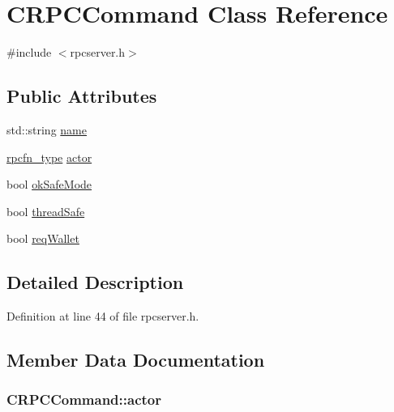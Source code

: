 \hypertarget{class_c_r_p_c_command}{}\section{C\+R\+P\+C\+Command Class Reference}
\label{class_c_r_p_c_command}


{\ttfamily \#include $<$rpcserver.\+h$>$}

\subsection*{Public Attributes}
\begin{DoxyCompactItemize}
\item 
std\+::string \hyperlink{class_c_r_p_c_command_a8da584c0d2d98be22ebff74d3cf2221c}{name}
\item 
\hyperlink{rpcserver_8h_a55410ecf7b981d238edda579f8c97040}{rpcfn\+\_\+type} \hyperlink{class_c_r_p_c_command_a197a7eba565b4d9673537655fcbc1344}{actor}
\item 
bool \hyperlink{class_c_r_p_c_command_a7f0b10e619917a3019f36ba5fa538adb}{ok\+Safe\+Mode}
\item 
bool \hyperlink{class_c_r_p_c_command_a0377f0b0f803b3698121f3a2b35d67b1}{thread\+Safe}
\item 
bool \hyperlink{class_c_r_p_c_command_a15bd6eb3af57f6382f15b2e927fdd445}{req\+Wallet}
\end{DoxyCompactItemize}


\subsection{Detailed Description}


Definition at line 44 of file rpcserver.\+h.



\subsection{Member Data Documentation}
\hypertarget{class_c_r_p_c_command_a197a7eba565b4d9673537655fcbc1344}{}
\subsubsection[{actor}]{ C\+R\+P\+C\+Command\+::actor}\label{class_c_r_p_c_command_a197a7eba565b4d9673537655fcbc1344}


